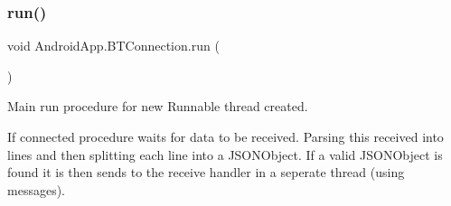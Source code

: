 \subsubsection{\texorpdfstring{run()}{run()}}
{\footnotesize\ttfamily void Android\+App.\+B\+T\+Connection.\+run (\begin{DoxyParamCaption}{ }\end{DoxyParamCaption})\hspace{0.3cm}{\ttfamily [inline]}}



Main run procedure for new Runnable thread created. 

If connected procedure waits for data to be received. Parsing this received into lines and then splitting each line into a J\+S\+O\+N\+Object. If a valid J\+S\+O\+N\+Object is found it is then sends to the receive handler in a seperate thread (using messages). 
